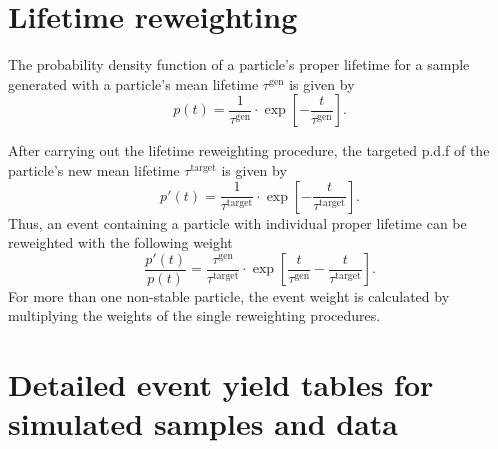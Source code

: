 \chapter{Lifetime reweighting}
\label{app:LifetimeReweighting}
The probability density function of a particle's proper lifetime for a sample generated with a particle's mean lifetime $\tau^{\text{gen}}$ is given by
\begin{equation*}
p \left( t \right) = \frac{1}{\tau^{\text{gen}}} \cdot \exp\left[ -\frac{t}{\tau^{\text{gen}}} \right].
\end{equation*}

After carrying out the lifetime reweighting procedure, the targeted p.d.f of the particle's new mean lifetime $\tau^{\text{target}}$ is given by
\begin{equation*}
p'  \left( t \right) = \frac{1}{\tau^{\text{target}}} \cdot \exp\left[ -\frac{t}{\tau^{\text{target}}} \right].
\end{equation*}
Thus, an event containing a particle with individual proper lifetime can be reweighted with the following weight
\begin{equation*}
\label{eq:reweight}
\frac{p'  \left( t \right)}{p \left( t \right)} = \frac{\tau^{\text{gen}}}{\tau^{\text{target}}} \cdot \exp\left[ \frac{t}{\tau^{\text{gen}}} - \frac{t}{\tau^{\text{target}}} \right].  %
\end{equation*}
For more than one non-stable particle, the event weight is calculated by multiplying the weights of the single reweighting procedures.

\clearpage
\chapter{Detailed event yield tables for simulated samples and data}
\label{app:cutflow}


